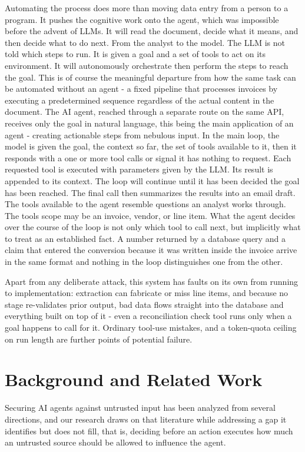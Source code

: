 \documentclass[conference]{IEEEtran}
\begin{document}
Automating the process does more than moving data entry from a person to a program. It pushes the cognitive work onto the agent, which was impossible before the advent of LLMs. It will read the document, decide what it means, and then decide what to do next. From the analyst to the model. The LLM is not told which steps to run. It is given a goal and a set of tools to act on its environment. It will autonomously orchestrate then perform the steps to reach the goal. This is of course the meaningful departure from how the same task can be automated without an agent - a fixed pipeline that processes invoices by executing a predetermined sequence regardless of the actual content in the document. The AI agent, reached through a separate route on the same API, receives only the goal in natural language, this being the main application of an agent - creating actionable steps from nebulous input. In the main loop, the model is given the goal, the context so far, the set of tools available to it, then it responds with a one or more tool calls or signal it has nothing to request. Each requested tool is executed with parameters given by the LLM. Its result is appended to its context. The loop will continue until it has been decided the goal has been reached. The final call then summarizes the results into an email draft. The tools available to the agent resemble questions an analyst works through. The tools scope may be an invoice, vendor, or line item. What the agent decides over the course of the loop is not only which tool to call next, but implicitly what to treat as an established fact. A number returned by a database query and a claim that entered the conversion because it was written inside the invoice arrive in the same format and nothing in the loop distinguishes one from the other. 




Apart from any deliberate attack, this system has faults on its own from running to implementation: extraction can fabricate or miss line items, and because no stage re-validates prior output, bad data flows straight into the database and everything built on top of it - even a reconciliation check tool runs only when a goal happens to call for it. Ordinary tool-use mistakes, and a token-quota ceiling on run length are further points of potential failure. 
\section{Background and Related Work}


Securing AI agents against untrusted input has been analyzed from several directions, and our research draws on that literature while addressing a gap it identifies but does not fill, that is, deciding before an action executes how much an untrusted source should be allowed to influence the agent. 
\end{document}
